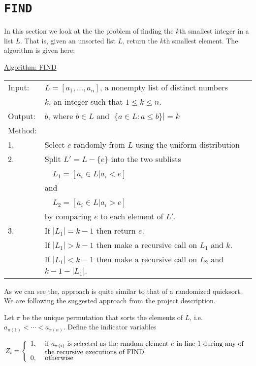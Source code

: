 \documentclass[article,a4paper,oneside]{memoir}
\newcommand{\+}[1]{\ensuremath{\boldsymbol{#1}}}
\begin{document}
\chapter{\texttt{FIND}}
In this section we look at the the problem of finding the $k$th smallest integer in a list $L$. That is, given an unsorted list $L$, return the $k$th smallest element.
The algorithm is given here:
\begin{center}\begin{minipage}{5in}
\underline{Algorithm: FIND}\\
\begin{tabular}{ll}
Input: & $L=[a_1,\ldots,a_n]$, a nonempty list of distinct numbers\\
& $k$, an integer such that $1\leq k\leq n$.\\ 
Output: & $b$, where $b\in L$ and $|\{a\in L:a\leq b\}|=k$\\
Method:\\
{\hfill}1. & Select $e$ randomly from $L$ using the uniform distribution\\
{\hfill}2. & Split $L'=L-\{e\}$ into the two sublists\\
& \ \ $L_1=[a_i\in L|a_i<e]$\\
& and\\
& \ \ $L_2=[a_i\in L|a_i>e]$\\
& by comparing $e$ to each element of $L'$.\\
{\hfill}3. & If $|L_1|=k-1$ then return $e$.\\
& If $|L_1|>k-1$ then make a recursive call on $L_1$ and $k$.\\
& \begin{minipage}{4in}
If $|L_1|<k-1$ then make a recursive call on $L_2$ and $k-1-|L_1|$.
\end{minipage}
\end{tabular}
\end{minipage}\end{center}
As we can see the, approach is quite similar to that of a randomized quicksort.
We are following the suggested approach from the project description.
\par

Let $\pi$ be the unique permutation that sorts the elements of $L$,
i.e. $a_{\pi(1)}<\cdots <a_{\pi(n)}$.  Define the indicator variables

$$Z_{i}=\left\{\begin{array}{ll}
1, & \mbox{
\begin{minipage}[t]{4in}
  if $a_{\pi(i)}$ is selected as the random element $e$ in line 1
  during any of the recursive executions of FIND
\end{minipage}
}
\\
0, & \mbox{ otherwise}
\end{array}\right.$$
\end{document}
